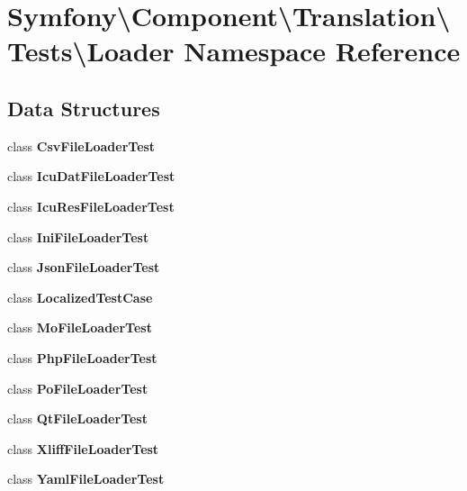 \section{Symfony\textbackslash{}Component\textbackslash{}Translation\textbackslash{}Tests\textbackslash{}Loader Namespace Reference}
\label{namespace_symfony_1_1_component_1_1_translation_1_1_tests_1_1_loader}
\subsection*{Data Structures}
\begin{DoxyCompactItemize}
\item 
class {\bf Csv\+File\+Loader\+Test}
\item 
class {\bf Icu\+Dat\+File\+Loader\+Test}
\item 
class {\bf Icu\+Res\+File\+Loader\+Test}
\item 
class {\bf Ini\+File\+Loader\+Test}
\item 
class {\bf Json\+File\+Loader\+Test}
\item 
class {\bf Localized\+Test\+Case}
\item 
class {\bf Mo\+File\+Loader\+Test}
\item 
class {\bf Php\+File\+Loader\+Test}
\item 
class {\bf Po\+File\+Loader\+Test}
\item 
class {\bf Qt\+File\+Loader\+Test}
\item 
class {\bf Xliff\+File\+Loader\+Test}
\item 
class {\bf Yaml\+File\+Loader\+Test}
\end{DoxyCompactItemize}
